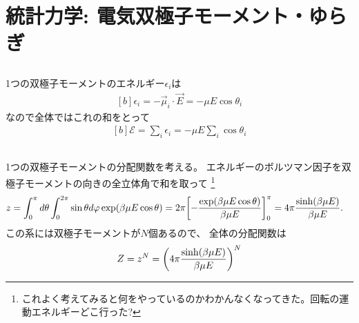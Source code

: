 \documentclass[../../master.tex]{subfiles}
\begin{document}
\chapter{統計力学: 電気双極子モーメント・ゆらぎ}
\section{}
1つの双極子モーメントのエネルギー\(\epsilon_i\)は
\begin{equation}\begin{aligned}[b]
    \epsilon_i = -\vec{\mu}_i \cdot \vec{E} = -\mu E \cos\theta_i
\end{aligned}\end{equation}
なので全体ではこれの和をとって
\begin{equation}\begin{aligned}[b]
    \mathcal{E} = \sum_i \epsilon_i = -\mu E\sum_{i} \cos\theta_i
\end{aligned}\end{equation}

\section{}
1つの双極子モーメントの分配関数を考える。
エネルギーのボルツマン因子を双極子モーメントの向きの全立体角で和を取って
\footnote{これよく考えてみると何をやっているのかわかんなくなってきた。回転の運動エネルギーどこ行った?}
\begin{equation}\begin{aligned}[b]
    z &= \int_0^\pi d\theta \int_{0}^{2\pi} \sin\theta d\varphi \exp(\beta\mu E\cos\theta)
    = 2\pi \qty[-\frac{\exp(\beta\mu E\cos\theta)}{\beta\mu E}]_0^\pi
    = 4\pi\frac{\sinh(\beta\mu E)}{\beta \mu E}.
\end{aligned}\end{equation}
この系には双極子モーメントが\(N\)個あるので、
全体の分配関数は
\begin{equation}\begin{aligned}[b]
    Z = z^N = \qty(4\pi\frac{\sinh(\beta\mu E)}{\beta \mu E})^N
\end{aligned}\end{equation}
\end{document}
